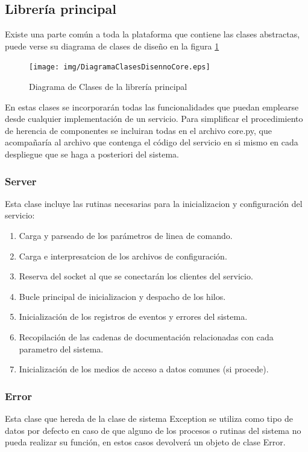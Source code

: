 \documentclass[a4paper,spanish,12pt]{book}
\begin{document}
\subsection{Librería principal}
Existe una parte común a toda la plataforma que contiene las clases abstractas, puede verse su diagrama de clases de diseño en la figura \ref{fig:DiagramaClasesDiseñoCore}

\begin{figure}[h]
	\texttt{[image: img/DiagramaClasesDisennoCore.eps]}
	\caption{Diagrama de Clases de la librería principal} 
	      \label{fig:DiagramaClasesDiseñoCore}
\end{figure}

En estas clases se incorporarán todas las funcionalidades que puedan emplearse desde cualquier implementación de un servicio. Para simplificar el procedimiento de herencia de componentes se incluiran todas en el archivo core.py, que acompañaría al archivo que contenga el código del servicio en si mismo en cada despliegue que se haga a posteriori del sistema.
\subsubsection{Server}
Esta clase incluye las rutinas necesarias para la inicializacion y configuración del servicio:
\begin{enumerate}
	\item Carga y parseado de los parámetros de linea de comando.
	\item Carga e interpresatcion de los archivos de configuración.
	\item Reserva del socket al que se conectarán los clientes del servicio.
	\item Bucle principal de inicializacion y despacho de los hilos.	
	\item Inicialización de los registros de eventos y errores del sistema.
	\item Recopilación de las cadenas de documentación relacionadas con cada parametro del sistema.
	\item Inicialización de los medios de acceso a datos comunes (si procede). 
\end{enumerate}
\subsubsection{Error}
Esta clase que hereda de la clase de sistema Exception se utiliza como tipo de datos por defecto en caso de que alguno de los procesos o rutinas del sistema no pueda realizar su función, en estos casos devolverá un objeto de clase Error.
\end{document}
